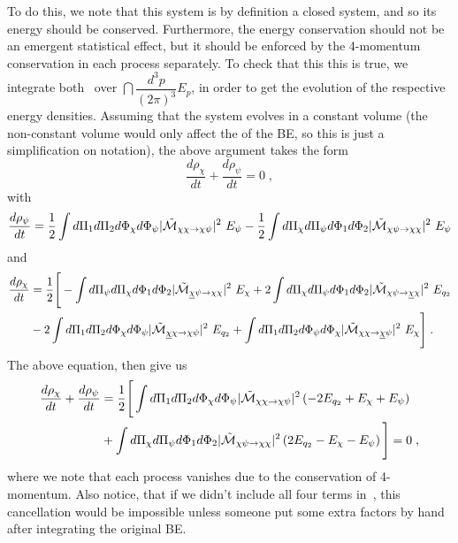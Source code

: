 \documentclass[11pt,a4paper]{article}
\begin{document}
%
To do this, we note that this system is by definition a closed system, and so its energy should be conserved. Furthermore, the energy conservation should not be  an emergent statistical effect, but it should be enforced by the 4-momentum conservation in each process separately. To check that this this is true, we integrate both~ over 
$\dint \dfrac{d^3 p}{ (2\pi)^3} E_p$, in order to get the evolution of the respective energy densities. Assuming that the system evolves in a constant volume (the non-constant volume would only affect the \rhs of the BE, so this is just a simplification on notation), the above argument takes the form
%
$$
\dfrac{d\rho_\chi}{dt} + \dfrac{d\rho_\psi}{dt} = 0 \;, 
$$
%
with
%
\begin{equation}
\dfrac{d\rho_\psi}{dt} = 
\dfrac{1}{2} \displaystyle \int d\Pi_{1}d\Pi_{2} d\Phi_{\chi} d\Phi_{\psi} |\tilde{ \mathcal{M} }_{\chi\chi \to \chi \psi}|^2 \ E_{\psi}  
-\dfrac{1}{2} \displaystyle \int  d\Pi_{\chi} d\Pi_{\psi} d\Phi_{1}d\Phi_{2}|\tilde{ \mathcal{M} }_{\chi \psi \to \chi\chi}|^2 \ E_{\psi}  
\label{eq:rho_phi_22}
\end{equation}
%
and 
%
\begin{eqnarray}
\dfrac{d\rho_\chi}{dt} &= \dfrac{1}{2} \Bigg[ 
	-\displaystyle \int d\Pi_{\psi} d\Pi_{\chi}  d\Phi_{1} d\Phi_{2}   |\tilde{ \mathcal{M} }_{\underline{\chi} \psi \to \chi \chi }|^2 \ E_{\chi}
	+ 2\displaystyle \int d\Pi_{\chi} d\Pi_{\psi} d\Phi_{1}d\Phi_{2}  |\tilde{ \mathcal{M} }_{\chi \psi  \to \underline{\chi} \chi}|^2 \ E_{q_2} 
	\nonumber \\
	&- 2\displaystyle \int d\Pi_{1}d\Pi_{2} d\Phi_{\chi} d\Phi_{\psi}   |\tilde{ \mathcal{M} }_{\underline{\chi} \chi \to \chi \psi }|^2 \ E_{q_2}
	+ \displaystyle \int  d\Pi_{1} d\Pi_{2} d\Phi_{\psi} d\Phi_{\chi}  |\tilde{ \mathcal{M} }_{\chi \chi  \to \underline{\chi} \psi}|^2 \ E_{\chi}
 \Bigg] \;.
\label{eq:rho_chi_22}
\end{eqnarray}
%
The above equation, then give us 
%
\begin{eqnarray}
\dfrac{d\rho_\chi}{dt} + \dfrac{d\rho_\psi}{dt} &=   \dfrac{1}{2} \Bigg[ 
\displaystyle \int d\Pi_{1}d\Pi_{2} d\Phi_{\chi} d\Phi_{\psi} |\tilde{ \mathcal{M} }_{\chi\chi \to \chi \psi}|^2 \left(  -2 E_{q_2} + E_\chi + E_\psi  \right) \\
&+
\displaystyle \int d\Pi_{\chi} d\Pi_{\psi} d\Phi_{1}d\Phi_{2} |\tilde{ \mathcal{M} }_{\chi \psi  \to \chi \chi}|^2 \left( 2 E_{q_2} -E_\chi -E_\psi   \right) 
 \Bigg] = 0 \;,
\end{eqnarray}
%
where we note that each process vanishes due to the conservation of 4-momentum. Also notice, that if we didn't include all four terms in~, this cancellation would be impossible unless someone put some extra factors by hand after integrating the original BE.
\end{document}
